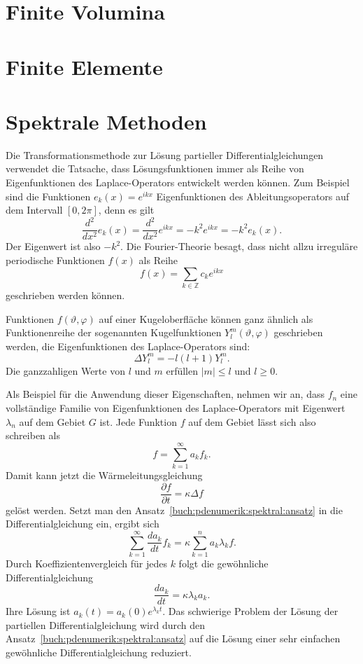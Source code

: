 %
%
\section{Finite Volumina
\label{buch:pdenumerik:section:fvm}}

%
%
\section{Finite Elemente
\label{buch:pdenumerik:section:fem}}

%
%
\section{Spektrale Methoden
\label{buch:pdenumerik:section:spektral}}
Die Transformationsmethode zur Lösung partieller Differentialgleichungen
verwendet die Tatsache, dass Lösungsfunktionen immer als Reihe von
Eigenfunktionen des Laplace-Operators entwickelt werden können.
Zum Beispiel sind die Funktionen
\(
e_k(x) = e^{ikx}
\)
Eigenfunktionen des Ableitungsoperators auf dem Intervall $[0,2\pi]$,
denn es gilt
\[
\frac{d^2}{dx^2} e_k(x)
=
\frac{d^2}{dx^2} e^{ikx}
=
-k^2 e^{ikx}
=
-k^2 e_k(x).
\]
Der Eigenwert ist also $-k^2$.
Die Fourier-Theorie besagt, dass nicht allzu irreguläre periodische
Funktionen $f(x)$ als Reihe
\[
f(x)
=
\sum_{k\in\mathbb{Z}} c_ke^{ikx}
\]
geschrieben werden können.

Funktionen $f(\vartheta,\varphi)$ auf einer Kugeloberfläche können
ganz ähnlich als Funktionenreihe der sogenannten Kugelfunktionen
$Y^m_l(\vartheta,\varphi)$ geschrieben werden, die Eigenfunktionen
des Laplace-Operators sind:
\[
\Delta Y^m_l
=
-l(l+1) Y^m_l.
\]
Die ganzzahligen Werte von $l$ und $m$ erfüllen $|m|\le l$ und $l\ge 0$.

Als Beispiel für die Anwendung dieser Eigenschaften, nehmen wir an,
dass $f_n$ eine vollständige Familie von Eigenfunktionen des Laplace-Operators
mit Eigenwert $\lambda_n$ auf dem Gebiet $G$ ist. 
Jede Funktion $f$ auf dem Gebiet lässt sich also schreiben als
\begin{equation}
f = \sum_{k=1}^\infty a_k f_k.
\label{buch:pdenumerik:spektral:ansatz}
\end{equation}
Damit kann jetzt die Wärmeleitungsgleichung
\[
\frac{\partial f}{\partial t}
=
\kappa
\Delta f
\]
gelöst werden.
Setzt man den Ansatz~\eqref{buch:pdenumerik:spektral:ansatz} in die 
Differentialgleichung ein, ergibt sich
\[
\sum_{k=1}^\infty
\frac{d a_k}{d t}
f_k
=
\kappa \sum_{k=1}^n a_k \lambda_k f.
\]
Durch Koeffizientenvergleich für jedes $k$ folgt die gewöhnliche
Differentialgleichung
\[
\frac{d a_k}{d t}
=
\kappa \lambda_k a_k.
\]
Ihre Lösung ist $a_k(t) = a_k(0) e^{\lambda_kt}$.
Das schwierige Problem der Lösung der partiellen Differentialgleichung
wird durch den Ansatz~\eqref{buch:pdenumerik:spektral:ansatz} auf die
Lösung einer sehr einfachen gewöhnliche Differentialgleichung reduziert.

